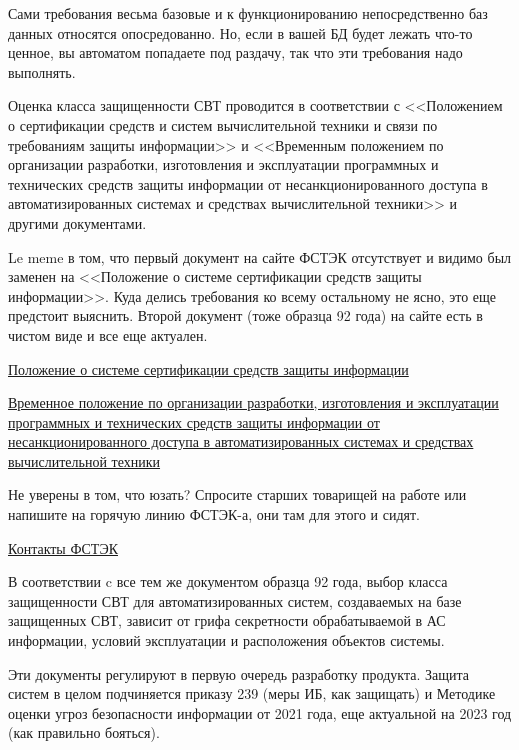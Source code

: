 Сами требования весьма базовые и к функционированию непосредственно баз данных относятся опосредованно. Но, если в вашей БД будет лежать что-то ценное, вы автоматом попадаете под раздачу, так что эти требования надо выполнять.

Оценка класса защищенности СВТ проводится в соответствии с
<<Положением о сертификации средств и систем вычислительной техники и связи по требованиям защиты информации>> и <<Временным положением по организации разработки, изготовления и эксплуатации программных и технических средств защиты информации от несанкционированного доступа в автоматизированных системах и средствах вычислительной техники>> и другими документами.

Le meme в том, что первый документ на сайте ФСТЭК отсутствует и видимо был заменен на <<Положение о системе сертификации средств защиты информации>>. Куда делись требования ко всему остальному не ясно, это еще предстоит выяснить. Второй документ (тоже образца 92 года) на сайте есть в чистом виде и все еще актуален.

\href {https://fstec.ru/component/attachments/download/1883}{Положение о системе сертификации средств защиты информации}

\href {https://fstec.ru/component/attachments/download/315}{Временное положение по организации разработки, изготовления и эксплуатации программных и технических средств защиты информации от несанкционированного доступа в автоматизированных системах и средствах вычислительной техники}

Не уверены в том, что юзать? Спросите старших товарищей на работе или напишите на горячую линию ФСТЭК-а, они там для этого и сидят.

\href{https://fstec.ru/kontakty}{Контакты ФСТЭК}

В соответствии c все тем же документом образца 92 года, выбор класса защищенности СВТ для автоматизированных систем, создаваемых на базе защищенных СВТ, зависит от грифа секретности обрабатываемой в АС информации, условий эксплуатации и расположения объектов системы.

Эти документы регулируют в первую очередь разработку продукта. Защита систем в целом подчиняется приказу 239 (меры ИБ, как защищать) и Методике оценки угроз безопасности информации от 2021 года, еще актуальной на 2023 год (как правильно бояться).

